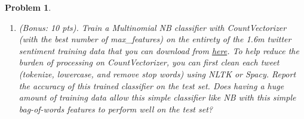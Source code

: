 \documentclass{article}
\newtheorem{problem}{Problem}
\begin{document}
\begin{problem}
\begin{enumerate}
\begin{enumerate}
    \item (1 pt) Train a logistic regression classifier using the above vector representation of tweets as your features. Report the accuracy of the trained classifier on the test set. Does dense feature representation improve the accuracy of your logistic regression classifier?
    \item (3 pts) Construct a vector representation of each tweet as the average of all the word vectors in the tweet\textsuperscript{\ref{note1}} after removing stop words\footnote{You can use NLTK or Spacy to remove stop words} (and ignoring words that do not have vector representations as before). Train a logistic regression classifier on this new representation of tweets as your features. Report the accuracy of the trained classifier on the test set. Does removing stop words improve performance?
\end{enumerate}
\item (Bonus: 10 pts). Train a Multinomial NB classifier with CountVectorizer (with the best number of max\_features) on the entirety of the 1.6m twitter sentiment training data that you can download from \href{http://help.sentiment140.com/for-students/}{here}. To help reduce the burden of processing on CountVectorizer, you can first clean each tweet (tokenize, lowercase, and remove stop words) using NLTK or Spacy. Report the accuracy of this trained classifier on the test set. Does having a huge amount of training data allow this simple classifier like NB with this simple bag-of-words features to perform well on the test set?
\end{enumerate}
\end{problem}
\end{document}
